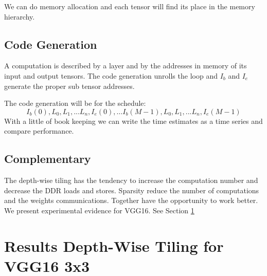 \documentclass[conference]{IEEEtran}
\begin{document}
We can do memory allocation and each tensor will find its place in the
memory hierarchy.

\subsection{Code Generation}
A computation is described by a layer and by the addresses in memory
of its input and output tensors. The code generation unrolls the loop
and $I_b$ and $I_e$ generate the proper sub tensor addresses.

The code generation will be for the schedule:
\[ I_b(0), L_0, L_1, ... L_n, I_e(0), \dots I_b(M-1), L_0, L_1, ... L_n, I_e(M-1) \]
With a little of book keeping we can write the time estimates as a
time series and compare performance.

\subsection{Complementary}
The depth-wise tiling has the tendency to increase the computation
number and decrease the DDR loads and stores. Sparsity reduce the
number of computations and the weights communications. Together have
the opportunity to work better. We present experimental evidence for
VGG16. See Section \ref{sec:res-depth}

\section{Results Depth-Wise Tiling for VGG16 3x3}
\label{sec:res-depth}
\end{document}
